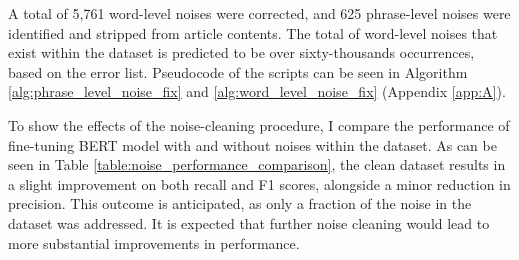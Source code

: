A total of 5,761 word-level noises were corrected, and 625 phrase-level noises were identified and stripped from article contents. The total of word-level noises that exist within the dataset is predicted to be over sixty-thousands occurrences, based on the error list. Pseudocode of the scripts can be seen in Algorithm \ref{alg:phrase_level_noise_fix} and \ref{alg:word_level_noise_fix} (Appendix \ref{app:A}).

To show the effects of the noise-cleaning procedure, I compare the performance of fine-tuning BERT model with and without noises within the dataset. As can be seen in Table \ref{table:noise_performance_comparison}, the clean dataset results in a slight improvement on both recall and F1 scores, alongside a minor reduction in precision. This outcome is anticipated, as only a fraction of the noise in the dataset was addressed. It is expected that further noise cleaning would lead to more substantial improvements in performance.


